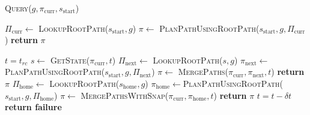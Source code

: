 \documentclass[letterpaper]{article} %
\begin{document}
\begin{algorithm}
\caption{\textsc{Query}($g, \pi_{\textrm{curr}},s_{\textrm{start}}$)}\label{alg:3}  
\begin{algorithmic}[1]
    \State $\Pi_{\textrm{curr}} \leftarrow$ \textsc{LookupRootPath}($s_{\textrm{start}},g$)
        \State $\pi \leftarrow$ \textsc{PlanPathUsingRootPath}($s_{\textrm{start}},g,\Pi_{\textrm{curr}}$)
        \State \textbf{return} $\pi$
    \EndIf

\State $t = t_{rc}$
    \State $s \leftarrow$ \textsc{GetState}($\pi_{\textrm{curr}}, t$)
    \State $\Pi_{\textrm{next}} \leftarrow$  \textsc{LookupRootPath}($s,g$)
        \State $\pi_{\textrm{next}} \leftarrow$\textsc{PlanPathUsingRootPath}($s_{\textrm{start}},g,\Pi_{\textrm{next}}$)
        \State $\pi \leftarrow$ \textsc{MergePaths}($\pi_{\textrm{curr}},\pi_{\textrm{next}},t$)
        \State \textbf{return} $\pi$
    \EndIf
    {\color{blue}
    \State $\Pi_{\textrm{home}} \leftarrow$ \textsc{LookupRootPath}($s_{\textrm{home}},g$)
            \State $\pi_{\textrm{home}} \leftarrow$\textsc{PlanPathUsingRootPath}($s_{\textrm{start}},g,\Pi_{\textrm{home}}$)
            \State $\pi \leftarrow$ \textsc{MergePathsWithSnap}($\pi_{\textrm{curr}},\pi_{\textrm{home}}, t$)
            \State \textbf{return} $\pi$
        \EndIf
    \EndIf
    }
    \State $t = t - \delta t$
\EndWhile
\State \textbf{return failure}
\end{algorithmic}
\end{algorithm}
\end{document}
